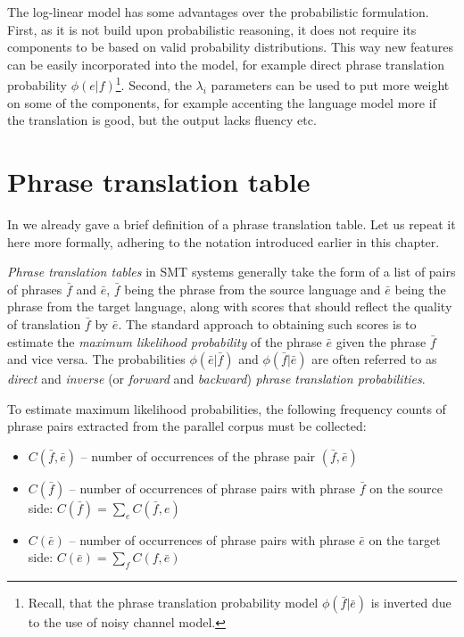 The log-linear model has some advantages over the probabilistic formulation.
First, as it is not build upon probabilistic reasoning, it does not require its
components to be based on valid probability distributions.
This way new features can be easily incorporated into the model, for example direct
phrase translation probability $\phi(e|f)$\footnote{Recall, that the phrase translation
probability model $\phi(\bar{f}|\bar{e})$ is inverted due to the use of noisy channel model.}.
Second, the $\lambda_i$ parameters can be used to put more weight on some of the components,
for example accenting the language model more if the translation is good, but the output
lacks fluency etc.

\section{Phrase translation table}
\label{sec:phrase-translation-table}


In  we already gave a brief definition of a phrase
translation table. Let us repeat it here more formally, adhering
to the notation introduced earlier in this chapter.

\emph{Phrase translation tables} in SMT systems generally take the form of a list of
pairs of phrases $\bar{f}$ and $\bar{e}$, $\bar{f}$ being the phrase from the source
language and $\bar{e}$ being the phrase from the target language, along with scores
that should reflect the quality of translation $\bar{f}$ by $\bar{e}$.
The standard approach to obtaining such scores is to estimate the \emph{maximum likelihood
probability} of the phrase $\bar{e}$ given the phrase $\bar{f}$ and vice versa.
The probabilities $\phi(\bar{e}|\bar{f})$ and $\phi(\bar{f}|\bar{e})$ are often
referred to as \emph{direct} and \emph{inverse} (or \emph{forward} and \emph{backward})
\emph{phrase translation probabilities}.

To estimate maximum likelihood probabilities, the following frequency counts
of phrase pairs extracted from the parallel corpus must be collected:
\begin{itemize}
  \item $C(\bar{f},\bar{e})$ -- number of occurrences of the phrase pair $(\bar{f},\bar{e})$
  \item $C(\bar{f})$ -- number of occurrences of phrase pairs with phrase $\bar{f}$ on the source side:
    $C(\bar{f}) = \sum_{e}{C(\bar{f},e)}$
  \item $C(\bar{e})$ -- number of occurrences of phrase pairs with phrase $\bar{e}$ on the target side:
    $C(\bar{e}) = \sum_{f}{C(f,\bar{e})}$
\end{itemize}

